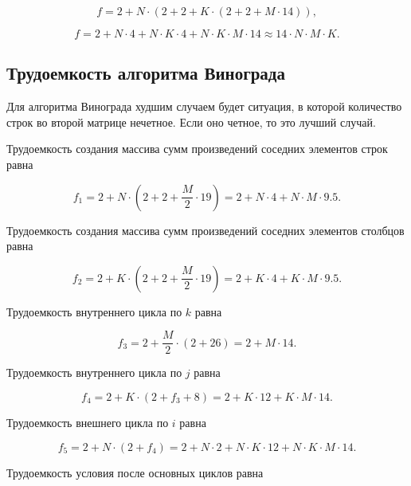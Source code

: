 \begin{equation}
	f = 2 + N \cdot (2 + 2 + K \cdot (2 + 2 + M \cdot 14)),
\end{equation}

\begin{equation}
	f = 2 + N \cdot 4 + N \cdot K \cdot 4 + N \cdot K \cdot M \cdot 14 \approx 14 \cdot N \cdot M \cdot K.
\end{equation}

\subsection{Трудоемкость алгоритма Винограда}

Для алгоритма Винограда худшим случаем будет ситуация, в которой количество строк во второй матрице нечетное. Если оно четное, то это лучший случай.

Трудоемкость создания массива сумм произведений соседних элементов строк равна

\begin{equation}
	f_1 = 2 + N \cdot (2 + 2 + \frac{M}{2} \cdot 19) = 2 + N \cdot 4 + N \cdot M \cdot 9.5.
\end{equation}

Трудоемкость создания массива сумм произведений соседних элементов столбцов равна

\begin{equation}
	f_2 = 2 + K \cdot (2 + 2 + \frac{M}{2} \cdot 19) = 2 + K \cdot 4 + K \cdot M \cdot 9.5.
\end{equation}

Трудоемкость внутреннего цикла по $k$ равна

\begin{equation}
	f_3 = 2 + \frac{M}{2} \cdot (2 + 26) = 2 + M \cdot 14.
\end{equation}

Трудоемкость внутреннего цикла по $j$ равна

\begin{equation}
	f_4 = 2 + K \cdot (2 + f_3 + 8) = 2 + K \cdot 12 + K \cdot M \cdot 14.
\end{equation}

Трудоемкость внешнего цикла по $i$ равна

\begin{equation}
	f_5 = 2 + N \cdot (2 + f_4) = 2 + N \cdot 2 + N \cdot K \cdot 12 + N \cdot K \cdot M \cdot 14.
\end{equation}

Трудоемкость условия после основных циклов равна

